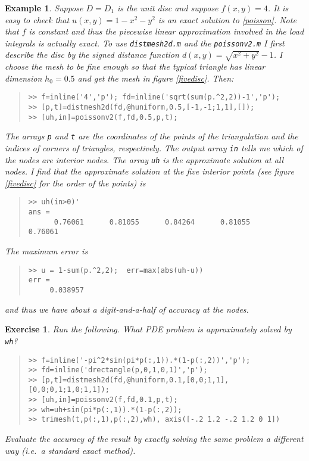 \documentclass[12pt]{amsart}
\newtheorem{example}{Example}
\newtheorem*{exercise}{Exercise}
\theoremstyle{definition}
\begin{document}
\begin{example}\label{exone}  Suppose $D=D_1$ is the unit disc and suppose $f(x,y)=4$.  It is easy to check that $u(x,y)=1-x^2-y^2$ is an exact solution to \eqref{poisson}.  Note that $f$ is constant and thus the piecewise linear approximation involved in the load integrals is actually exact.  To use \emph{\texttt{distmesh2d.m}} and the \emph{\texttt{poissonv2.m}} I first describe the disc by the signed distance function $d(x,y)=\sqrt{x^2+y^2}-1$.  I choose the mesh to be fine enough so that the typical triangle has linear dimension $h_0=0.5$ and get the mesh in figure \ref{fivedisc}.  Then:
\small\begin{quote}\begin{verbatim}
>> f=inline('4','p'); fd=inline('sqrt(sum(p.^2,2))-1','p');
>> [p,t]=distmesh2d(fd,@huniform,0.5,[-1,-1;1,1],[]);
>> [uh,in]=poissonv2(f,fd,0.5,p,t);
\end{verbatim}
\end{quote}\normalsize
The arrays \emph{\texttt{p}} and \emph{\texttt{t}} are the coordinates of the points of the triangulation and the indices of corners of triangles, respectively.  The output array \emph{\texttt{in}} tells me which of the nodes are interior nodes.  The array \emph{\texttt{uh}} is the approximate solution at all nodes.  I find that the approximate solution at the five interior points (see figure \ref{fivedisc} for the order of the points) is
\small\begin{quote}\begin{verbatim}
>> uh(in>0)'
ans =
      0.76061      0.81055      0.84264      0.81055      0.76061
\end{verbatim}
\end{quote}\normalsize
The maximum error is
\small\begin{quote}\begin{verbatim}
>> u = 1-sum(p.^2,2);  err=max(abs(uh-u))
err =
     0.038957
\end{verbatim}
\end{quote}\normalsize
and thus we have about a digit-and-a-half of accuracy at the nodes.
\end{example}

\begin{exercise}  Run the following.  What PDE problem is approximately solved by \emph{\texttt{wh}}?
\small\begin{quote}\begin{verbatim}
>> f=inline('-pi^2*sin(pi*p(:,1)).*(1-p(:,2))','p');
>> fd=inline('drectangle(p,0,1,0,1)','p');
>> [p,t]=distmesh2d(fd,@huniform,0.1,[0,0;1,1],[0,0;0,1;1,0;1,1]);
>> [uh,in]=poissonv2(f,fd,0.1,p,t);
>> wh=uh+sin(pi*p(:,1)).*(1-p(:,2));
>> trimesh(t,p(:,1),p(:,2),wh), axis([-.2 1.2 -.2 1.2 0 1])
\end{verbatim}
\end{quote}\normalsize
Evaluate the accuracy of the result by exactly solving the same problem a different way (i.e.~a standard exact method).
\end{exercise}
\end{document}
